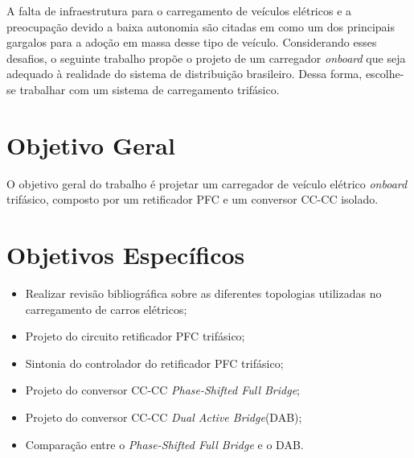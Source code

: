 
A falta de infraestrutura para o carregamento de veículos elétricos e a preocupação devido a baixa autonomia são citadas em \cite{Karneddi:2021} como
um dos principais gargalos para a adoção em massa desse tipo de veículo. Considerando esses desafios,
o seguinte trabalho propõe o projeto de um carregador \textit{onboard} que seja adequado à realidade do sistema de distribuição
brasileiro. Dessa forma, escolhe-se trabalhar com um sistema de carregamento trifásico.



\section{Objetivo Geral}
O objetivo geral do trabalho é projetar um carregador de veículo elétrico \textit{onboard} trifásico, composto por um retificador PFC e um conversor CC-CC isolado.
\section{Objetivos Específicos}
\begin{itemize}
    \item Realizar revisão bibliográfica sobre as diferentes topologias utilizadas no carregamento de carros elétricos;
    \item Projeto do circuito retificador PFC trifásico;
    \item Sintonia do controlador do retificador PFC trifásico;
    \item Projeto do conversor CC-CC \textit{Phase-Shifted Full Bridge};
    \item Projeto do conversor CC-CC \textit{Dual Active Bridge}(DAB);
    \item Comparação entre o \textit{Phase-Shifted Full Bridge} e o DAB.
\end{itemize}